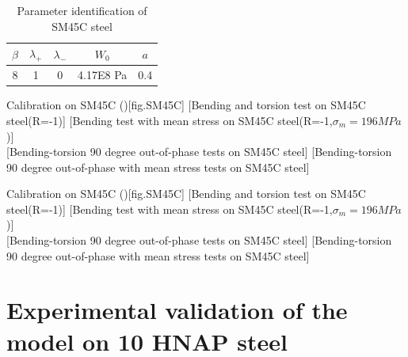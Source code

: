\begin{table}[!h]
\centering
\begin{tabular}{|c|c|c|c|c|}
	\hline
	\textbf{$\beta$} & \textbf{$\lambda_+$} & \textbf{$\lambda_-$} & \textbf{$W_0$} & \textbf{$a$}  \\ \hline
	8    & 1 &0         &4.17E8 Pa  & 0.4    \\ \hline
\end{tabular}
\caption{Parameter identification of SM45C steel}
\label{sm45cpara}
\end{table}

\begin{Figure}[!h]{Calibration on  SM45C (\cite{lee2013out})}[fig.SM45C]
	[Bending and torsion test on SM45C steel(R=-1)]
	[Bending test with mean stress on SM45C steel(R=-1,$\sigma_m=196 MPa$)]
	\\
	[Bending-torsion 90 degree out-of-phase tests on SM45C steel]
	[Bending-torsion 90 degree out-of-phase with mean stress tests on SM45C steel]
\end{Figure}

\begin{Figure}[!h]{Calibration on  SM45C (\cite{lee2013out})}[fig.SM45C]
[Bending and torsion test on SM45C steel(R=-1)]
[Bending test with mean stress on SM45C steel(R=-1,$\sigma_m=196 MPa$)]
\\
[Bending-torsion 90 degree out-of-phase tests on SM45C steel]
[Bending-torsion 90 degree out-of-phase with mean stress tests on SM45C steel]
\end{Figure}


\clearpage
\section{Experimental validation of the model on 10 HNAP steel}
